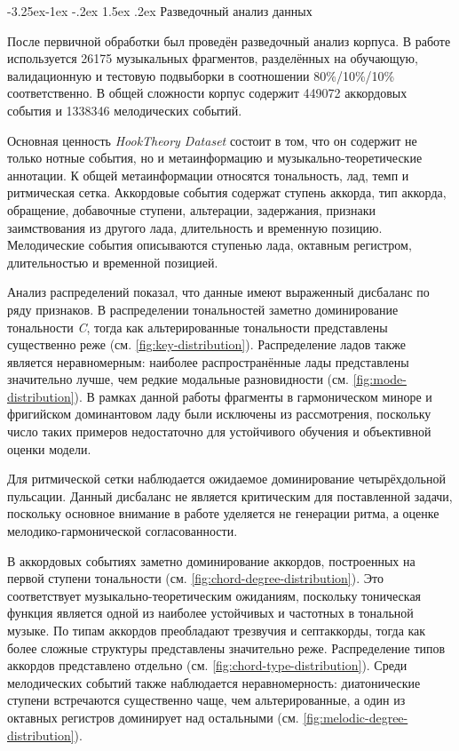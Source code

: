 \documentclass[a4paper,12pt]{extarticle}
\makeatletter
\renewcommand\subsection{\@startsection{subsection}{2}{\z@}%
  {-3.25ex\@plus -1ex \@minus -.2ex}%
  {1.5ex \@plus .2ex}%
  {\normalfont\large\bfseries\Needspace{6\baselineskip}}}
\makeatother
\begin{document}
\subsection{Разведочный анализ данных}

После первичной обработки был проведён разведочный анализ корпуса. В работе используется 26175 музыкальных фрагментов, разделённых на обучающую, валидационную и тестовую подвыборки в соотношении 80\%/10\%/10\% соответственно. В общей сложности корпус содержит 449072 аккордовых события и 1338346 мелодических событий.

Основная ценность \textit{HookTheory Dataset} состоит в том, что он содержит не только нотные события, но и метаинформацию и музыкально-теоретические аннотации. К общей метаинформации относятся тональность, лад, темп и ритмическая сетка. Аккордовые события содержат ступень аккорда, тип аккорда, обращение, добавочные ступени, альтерации, задержания, признаки заимствования из другого лада, длительность и временную позицию. Мелодические события описываются ступенью лада, октавным регистром, длительностью и временной позицией.

Анализ распределений показал, что данные имеют выраженный дисбаланс по ряду признаков. В распределении тональностей заметно доминирование тональности \textit{C}, тогда как альтерированные тональности представлены существенно реже (см. \ref{fig:key-distribution}). Распределение ладов также является неравномерным: наиболее распространённые лады представлены значительно лучше, чем редкие модальные разновидности (см. \ref{fig:mode-distribution}). В рамках данной работы фрагменты в гармоническом миноре и фригийском доминантовом ладу были исключены из рассмотрения, поскольку число таких примеров недостаточно для устойчивого обучения и объективной оценки модели.

Для ритмической сетки наблюдается ожидаемое доминирование четырёхдольной пульсации. Данный дисбаланс не является критическим для поставленной задачи, поскольку основное внимание в работе уделяется не генерации ритма, а оценке мелодико-гармонической согласованности.

В аккордовых событиях заметно доминирование аккордов, построенных на первой ступени тональности (см. \ref{fig:chord-degree-distribution}). Это соответствует музыкально-теоретическим ожиданиям, поскольку тоническая функция является одной из наиболее устойчивых и частотных в тональной музыке. По типам аккордов преобладают трезвучия и септаккорды, тогда как более сложные структуры представлены значительно реже. Распределение типов аккордов представлено отдельно (см. \ref{fig:chord-type-distribution}). Среди мелодических событий также наблюдается неравномерность: диатонические ступени встречаются существенно чаще, чем альтерированные, а один из октавных регистров доминирует над остальными (см. \ref{fig:melodic-degree-distribution}).
\end{document}
